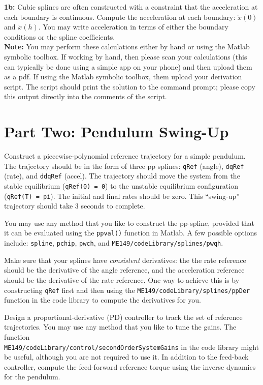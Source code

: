 \textbf{1b:} Cubic splines are often constructed with a constraint that the
acceleration at each boundary is continuous. Compute the acceleration at each
boundary: $\ddot{x}(0)$ and $\ddot{x}(h)$. You may write acceleration in terms
of either the boundary conditions or the spline coefficients. \\

\textbf{Note:} You may perform these calculations either by hand or using the
Matlab symbolic toolbox. If working by hand, then please scan your calculations
(this can typically be done using a simple app on your phone)
and then upload them as a pdf.
If using the Matlab symbolic toolbox, them upload your derivation script.
The script should print the solution to the command prompt; please copy this
output directly into the comments of the script.

\section*{Part Two: Pendulum Swing-Up}

Construct a piecewise-polynomial reference trajectory for a simple pendulum.
The trajectory should be in the form of three pp splines:
\texttt{qRef} (angle),
\texttt{dqRef} (rate), and
\texttt{ddqRef} (accel).
The trajectory should move the system from the
stable equilibrium (\texttt{qRef(0) = 0}) to the
unstable equilibrium configuration (\texttt{qRef(T) = pi}).
The initial and final rates should be zero.
This ``swing-up'' trajectory should take 3 seconds to complete.

\par
You may use any method that you like to construct the pp-spline,
provided that it can be evaluated using the \texttt{ppval()} function in Matlab.
A few possible options include:
\texttt{spline}, \texttt{pchip}, \texttt{pwch},
and \texttt{ME149/codeLibrary/splines/pwqh}.

\par
Make sure that your splines have \textit{consistent} derivatives: the
the rate reference should be the derivative of the angle reference, and the
acceleration reference should be the derivative of the rate reference.
One way to achieve this is by constructing \texttt{qRef} first and then using
the \texttt{ME149/codeLibrary/splines/ppDer} function in the code library
to compute the derivatives for you.

\par
Design a proportional-derivative (PD) controller to track the set of
reference trajectories. You may use any method that you like to tune the gains.
The function\\
\texttt{ME149/codeLibrary/control/secondOrderSystemGains}
in the
code library might be useful, although you are not required to use it.
In addition to the feed-back controller, compute the feed-forward reference
torque using the inverse dynamics for the pendulum.

